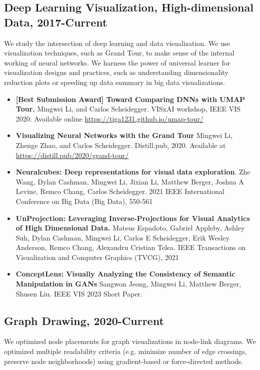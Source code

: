 \documentclass[letterpaper,11pt,oneside]{article}
\begin{document}
\subsection*{Deep Learning Visualization, High-dimensional Data, 2017-Current}
We study the intersection of deep learning and data visualization. 
    We use visualization techniques, such as Grand Tour, to make sense of the internal working of neural networks. 
    We harness the power of universal learner for visualization designs and practices, such as understanding dimensionality reduction plots or speeding up data summary in big data visualizations.
    \begin{itemize}
        \item \textbf{[Best Submission Award] Toward Comparing DNNs with UMAP Tour. }
            Mingwei Li, and Carlos Scheidegger. 
            VISxAI workshop, IEEE VIS 2020. Available online \url{https://tiga1231.github.io/umap-tour/}
        \item \textbf{Visualizing Neural Networks with the Grand Tour}
            Mingwei Li, Zhenge Zhao, and Carlos Scheidegger.
            Distill.pub, 2020. Available at \url{https://distill.pub/2020/grand-tour/}
        \item \textbf{Neuralcubes: Deep representations for visual data exploration}. 
            Zhe Wang, Dylan Cashman, Mingwei Li, Jixian Li, Matthew Berger, Joshua A Levine, Remco Chang, Carlos Scheidegger. 
            2021 IEEE International Conference on Big Data (Big Data), 550-561
        \item \textbf{UnProjection: Leveraging Inverse-Projections for Visual Analytics of High Dimensional Data.}
            Mateus Espadoto, Gabriel Appleby, Ashley Suh, Dylan Cashman, Mingwei Li, Carlos E Scheidegger, Erik Wesley Anderson, Remco Chang, Alexandru Cristian Telea. 
            IEEE Transactions on Visualization and Computer Graphics (TVCG), 2021
        \item \textbf{ConceptLens: Visually Analyzing the Consistency of Semantic Manipulation in GANs}
            Sangwon Jeong, Mingwei Li, Matthew Berger, Shusen Liu.
            IEEE VIS 2023 Short Paper.


    \end{itemize}


\subsection*{Graph Drawing, 2020-Current}
We optimized node placements for graph visualizations in node-link diagrams. 
We optimized multiple readability criteria (e.g. minimize number of edge crossings, preserve node neighborhoods) using gradient-based or force-directed methods. 
\end{document}
